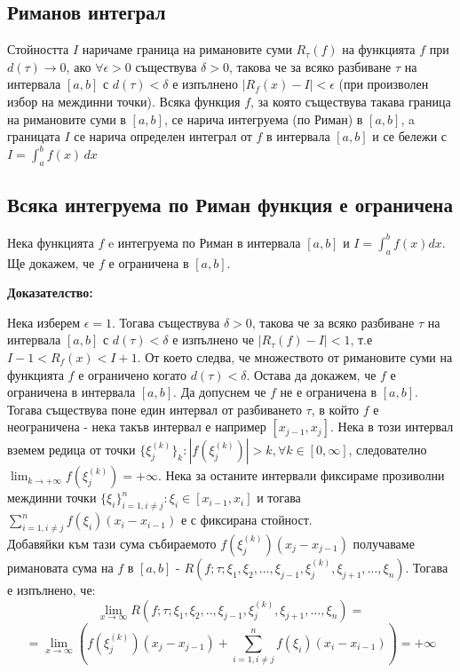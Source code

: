 \documentclass[fleqn,12pt]{article}
\begin{document}
\subsection{Риманов интеграл}
Стойността $I$ наричаме граница на римановите суми $R_\tau(f)$ на функцията $f$ при $d(\tau)\rightarrow0$, 
ако $\forall\epsilon>0$ съществува  $\delta>0$, такова че за всяко разбиване $\tau$
на интервала $[a,b]$ с $d(\tau)<\delta$ е изпълнено $|R_f(x) - I|<\epsilon$ (при произволен избор на междинни точки). 
Всяка функция $f$, за която съществува такава граница на римановите суми в $[a,b]$,
се нарича интегруема (по Риман) в $[a,b]$, a границата $I$ се нарича определен интеграл от $f$ в интервала $[a,b]$ и се бележи с $I = \int_{a}^{b}  f(x)\,dx$ 

\subsection{Всяка интегруема по Риман функция е ограничена}
Нека функцията $f$ e интегруема по Риман в интервала $[a,b]$ и $I = \int_{a}^{b}  f(x)dx$. Ще докажем, че $f$ е ограничена в $[a,b]$.

\noindent \textbf{Доказателство: }

Нека изберем $\epsilon=1$. Тогава съществува $\delta>0$, такова че 
за всяко разбиване $\tau$ на интервала $[a,b]$ с $d(\tau)<\delta$ е изпълнено че $|R_\tau(f) - I|<1$, т.е $I-1<R_f(x)<I+1$. От което следва, че множеството от римановите суми на функцията
$f$ е ограничено когато $d(\tau)<\delta$. Остава да докажем, че $f$ е ограничена в интервала $[a,b]$.
Да допуснем че $f$ не е ограничена в $[a,b]$. Тогава съществува поне един интервал от разбиването $\tau$, в който $f$ е неограничена - нека такъв интервал е например $[x_{j-1},x_j]$.
Нека в този интервал вземем редица от точки $\{\xi_j^{(k)}\}_k : |f(\xi_j^{(k)})| > k, \forall k \in [0,\infty]$, следователно $\lim_{k \rightarrow +\infty} f(\xi_j^{(k)}) = +\infty$.
Нека за останите интервали фиксираме прозиволни междинни точки $\{\xi_i\}_{i=1,i \neq j}^n : \xi_i \in [x_{i-1},x_i]$ и тогава $\sum_{i=1,i \neq j}^{n} f(\xi_i)(x_i - x_{i-1})$ е с фиксирана стойност.\\

Добавяйки към тази сума събираемото $f(\xi_j^{(k)})(x_j - x_{j-1})$ получаваме римановата сума на $f$ в $[a,b]$ - 
$R(f;\tau;\xi_1,\xi_2, \dots ,\xi_{j-1},\xi_j^{(k)},\xi_{j+1}, \dots ,\xi_n)$. Тогава е изпълнено, че:
\[ \lim_{x \rightarrow \infty} R(f;\tau;\xi_1,\xi_2, .. ,\xi_{j-1},\xi_j^{(k)},\xi_{j+1}, \dots ,\xi_n) = \] 
\[ = \lim_{x \rightarrow \infty} (f(\xi_j^{(k)})(x_j - x_{j-1}) + \sum_{i=1,i \neq j}^{n} f(\xi_i)(x_i - x_{i-1})) = +\infty \]
\end{document}
